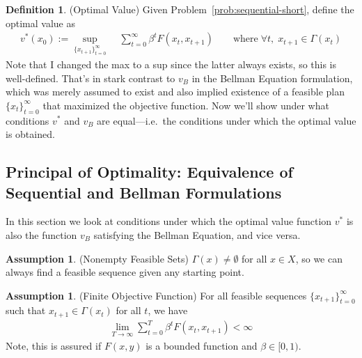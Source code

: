 \documentclass[12pt]{article}
\numberwithin{equation}{section} %
\theoremstyle{plain}
\theoremstyle{definition}
\newtheorem{defn}[thm]{Definition}
\newtheorem{assump}[thm]{Assumption}
\theoremstyle{remark}
\newcommand{\sumtinfz}{\sum^\infty_{t=0}}
\begin{document}
\begin{defn}{(Optimal Value)}
\label{defn:vstar}
Given Problem~\ref{prob:sequential-short}, define the optimal value as
\begin{align}
  v^*(x_0) := \sup_{\{x_{t+1}\}_{t=0}^\infty}
  \; &\sumtinfz \beta^t F(x_t,x_{t+1})
  \qquad \text{where}\;
  \forall t, \; x_{t+1} \in \Gamma(x_t)
\end{align}
Note that I changed the max to a sup since the latter always exists, so
this is well-defined. That's in stark contrast to $v_B$ in the Bellman
Equation formulation, which was merely assumed to exist and also implied
existence of a feasible plan $\{x_t\}_{t=0}^\infty$ that maximized the
objective function. Now we'll show under what conditions $v^*$ and $v_B$
are equal---i.e.\ the conditions under which the optimal value is
obtained.
\end{defn}

\subsection{Principal of Optimality: Equivalence of Sequential and
Bellman Formulations}

In this section we look at conditions under which the optimal value
function $v^*$ is also the function $v_B$ satisfying the Bellman
Equation, and vice versa.

\begin{assump}{(Nonempty Feasible Sets)}
\label{assump:feasible}
$\Gamma(x)\neq\emptyset$ for all $x\in X$, so we can always find a
feasible sequence given any starting point.
\end{assump}

\begin{assump}{(Finite Objective Function)}
\label{assump:finite}
For all feasible sequences $\{x_{t+1}\}_{t=0}^\infty$ such that
$x_{t+1}\in \Gamma(x_t)$ for all $t$, we have
\begin{align*}
  \lim_{T\rightarrow\infty} \sum_{t=0}^T \beta^t F(x_t,x_{t+1})
  < \infty
\end{align*}
Note, this is assured if $F(x,y)$ is a bounded function and
$\beta\in[0,1)$.
\end{assump}
\end{document}
